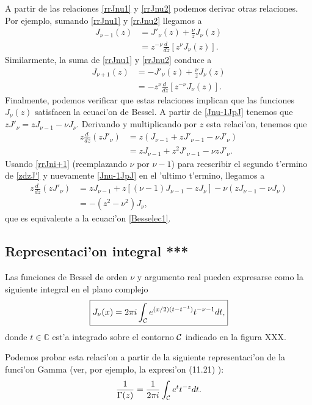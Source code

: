 A partir de las relaciones \eqref{rrJnu1} y \eqref{rrJnu2} podemos derivar otras relaciones. Por ejemplo, sumando \eqref{rrJnu1} y \eqref{rrJnu2} llegamos a
\begin{align}
J_{\nu-1}(z) &= J'_{\nu}(z)+\frac{\nu}{z}J_\nu(z) \label{Jnu-1JpJ}\\
&= z^{-\nu}\frac{d\ }{dz}\left[z^\nu J_\nu(z)\right]. \label{Jnu-1JpJ2}
\end{align}
Similarmente, la suma de \eqref{rrJnu1} y \eqref{rrJnu2} conduce a 
\begin{align}
J_{\nu+1}(z) &= -J'_{\nu}(z)+\frac{\nu}{z}J_\nu(z) \label{rrJni+1} \\
&= -z^{\nu}\frac{d\ }{dz}\left[z^{-\nu} J_\nu(z)\right]. \label{rrJni+2}
\end{align}
Finalmente, podemos verificar que estas relaciones implican que las funciones $J_\nu(z)$ satisfacen la ecuaci'on de Bessel. A partir de \eqref{Jnu-1JpJ} tenemos que $zJ'_\nu=zJ_{\nu-1}-\nu J_\nu$. Derivando y multiplicando por $z$ esta relaci'on, tenemos que
\begin{align}
z\frac{d\ }{dz}(zJ'_\nu) &= z\left(J_{\nu-1}+zJ'_{\nu-1}-\nu J'_\nu\right)\\
&= zJ_{\nu-1}+z^2J'_{\nu-1}-\nu zJ'_\nu. \label{zdzJ'}
\end{align}
Usando \eqref{rrJni+1} (reemplazando $\nu$ por $\nu-1$) para reescribir el segundo t'ermino de \eqref{zdzJ'} y nuevamente \eqref{Jnu-1JpJ} en el 'ultimo t'ermino, llegamos a
\begin{align}
z\frac{d\ }{dz}(zJ'_\nu) &= zJ_{\nu-1}+z\left[(\nu-1)J_{\nu-1}-zJ_\nu\right]-\nu (zJ_{\nu-1}-\nu J_\nu) \\
&= -(z^2-\nu^2) J_\nu,
\end{align}
que es equivalente a la ecuaci'on \eqref{Besselec1}.

\subsection{Representaci'on integral ***}
Las funciones de Bessel de orden $\nu$ y argumento real pueden expresarse como la siguiente integral en el plano complejo
\begin{equation}\label{RIJnu}
\boxed{J_\nu(x)=2\pi i\int_{\cal C}e^{(x/2)(t-t^{-1})}t^{-\nu-1}dt,}
\end{equation}
donde $t\in\mathbb{C}$ est'a integrado sobre el contorno $\cal C$ indicado en la figura XXX.

Podemos probar esta relaci'on a partir de la siguiente representaci'on de la funci'on Gamma (ver, por ejemplo, la expresi'on (11.21) \cite{Hassani}):
\begin{equation}\label{1sGint}
\frac{1}{\Gamma(z)}=\frac{1}{2\pi i}\int_{\cal C}e^t t^{-z}dt.
\end{equation}

